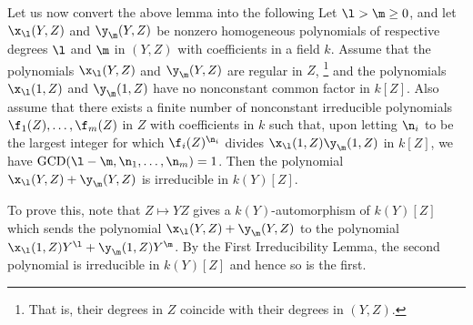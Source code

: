 Let us now convert the above lemma into the following
Let $\l>\m\ge 0$, and let 
$\x_{\l}(Y,Z)$ and $\y_{\m}(Y,Z)$ be nonzero homogeneous 
polynomials of 
respective degrees $\l$ and $\m$ in $(Y,Z)$ with 
coefficients in a field $k$.
Assume that the polynomials $\x_{\l}(Y,Z)$ and 
$\y_{\m}(Y,Z)$ 
are regular in $Z$,
\footnote{That is, their degrees in $Z$ coincide with 
their degrees in
$(Y,Z)$.}
and the polynomials $\x_{\l}(1,Z)$ and $\y_{\m}(1,Z)$ have 
no nonconstant 
common factor in $k[Z]$.
Also assume that there exists a finite number of 
nonconstant irreducible 
polynomials $\f_1(Z),\dots,\f_m(Z)$ in $Z$ 
with coefficients in $k$ such that, upon letting $\n_i$ to 
be the largest 
integer for which $\f_i(Z)^{\n_i}$ divides 
$\x_{\l}(1,Z)\y_{\m}(1,Z)$ in 
$k[Z]$, we have 
$\operatorname{GCD}(\l-\m,\n_1,\dots,\n_m)=1$. Then the 
polynomial 
$\x_{\l}(Y,Z)+\y_{\m}(Y,Z)$ is irreducible in $k(Y)[Z]$.
\endproclaim

To prove this, note that $Z\mapsto YZ$ gives a 
$k(Y)$-automorphism of
$k(Y)[Z]$ which sends the polynomial $\x_{\l}(Y,Z)+
\y_{\m}(Y,Z)$ 
to the polynomial $\x_{\l}(1,Z)Y^{\l} +\y_{\m}(1,Z)Y^{\m}$.
By the First Irreducibility Lemma, the second polynomial is
irreducible in $k(Y)[Z]$ and hence so is the first.


